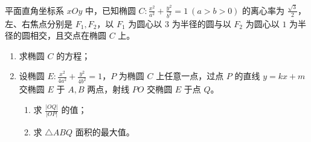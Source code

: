 \begin{example}
平面直角坐标系 \(xOy\) 中，已知椭圆 \(C: \frac{x^2}{a^2} + \frac{y^2}{b^2} = 1\ (a > b > 0)\) 的离心率为 \(\frac{\sqrt{3}}{2}\)，左、右焦点分别是 \(F_1,F_2\)，以 \(F_1\) 为圆心以 \(3\) 为半径的圆与以 \(F_2\) 为圆心以 \(1\) 为半径的圆相交，且交点在椭圆 \(C\) 上。
\begin{enumerate}
    \item[(1)] 求椭圆 \(C\) 的方程；
    \item[(2)] 设椭圆 \(E: \frac{x^2}{4a^2} + \frac{y^2}{4b^2} = 1\)，\(P\) 为椭圆 \(C\) 上任意一点，过点 \(P\) 的直线 \(y = kx + m\) 交椭圆 \(E\) 于 \(A,B\) 两点，射线 \(PO\) 交椭圆 \(E\) 于点 \(Q\)。
    \begin{enumerate}
        \item[(i)] 求 \(\frac{|OQ|}{|OP|}\) 的值；
        \item[(ii)] 求 \(\triangle ABQ\) 面积的最大值。
    \end{enumerate}
\end{enumerate}
\end{example}
